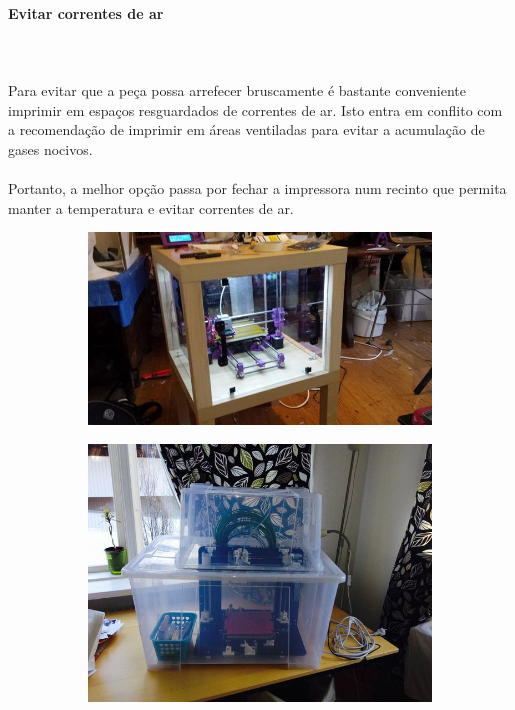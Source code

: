 \documentclass[11pt,a4paper]{article}
\begin{document}
			\paragraph{Evitar correntes de ar}\mbox{}\\\\
Para evitar que a peça possa arrefecer bruscamente é bastante conveniente imprimir em espaços resguardados de correntes de ar. Isto entra em conflito com a recomendação de imprimir em áreas ventiladas para evitar a acumulação de gases nocivos.
\\\\
Portanto, a melhor opção passa por fechar a impressora num recinto que permita manter a temperatura e evitar correntes de ar.
\begin{figure}[H]
    \centering
    \begin{subfigure}[b]{0.3\textwidth}
        \includegraphics[width=\textwidth,cfbox=azul_marcos 4pt 0pt]{FOTOS/CERRAMIENTO1}
    \end{subfigure}
    \quad %
    \begin{subfigure}[b]{0.3\textwidth}
        \includegraphics[width=\textwidth,cfbox=azul_marcos 4pt 0pt]{FOTOS/CERRAMIENTO2}

\end{subfigure}
\end{figure}
\end{document}
